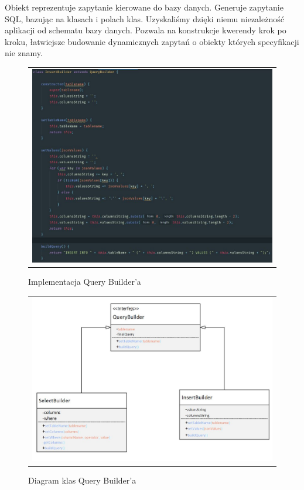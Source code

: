 \documentclass{sprawozdanie-agh}
\begin{document}
	Obiekt reprezentuje zapytanie kierowane do bazy danych. Generuje zapytanie SQL, bazując na
	klasach i polach klas. Uzyskaliśmy dzięki niemu niezależność aplikacji od schematu bazy danych.	Pozwala na konstrukcje kwerendy krok po kroku, łatwiejsze budowanie dynamicznych zapytań o obiekty których specyfikacji nie znamy.
	
	\begin{figure}[H] 
		\centering
		\begin{tabular}{c}
			\includegraphics[width=.99\textwidth]{insertbuilder}
		\end{tabular} 
		\caption{Implementacja Query Builder'a}
	\end{figure}

	\begin{figure}[H] 
		\centering
		\begin{tabular}{c}
			\includegraphics[width=.99\textwidth]{querybuilder}
		\end{tabular} 
		\caption{Diagram klas Query Builder'a}
	\end{figure}
	
\end{document}
